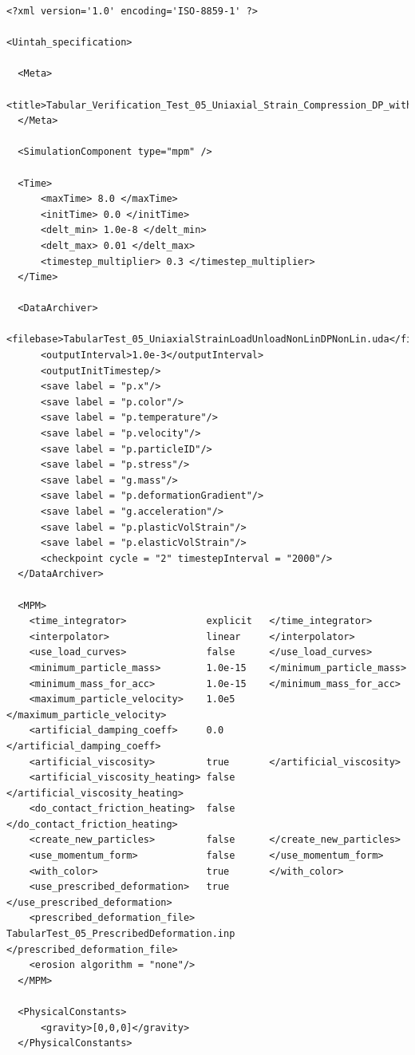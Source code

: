 \begin{lstlisting}
<?xml version='1.0' encoding='ISO-8859-1' ?>

<Uintah_specification>

  <Meta>
      <title>Tabular_Verification_Test_05_Uniaxial_Strain_Compression_DP_with_LoadUnload</title>
  </Meta>

  <SimulationComponent type="mpm" />

  <Time>
      <maxTime> 8.0 </maxTime>
      <initTime> 0.0 </initTime>
      <delt_min> 1.0e-8 </delt_min>
      <delt_max> 0.01 </delt_max>
      <timestep_multiplier> 0.3 </timestep_multiplier>
  </Time>

  <DataArchiver>
      <filebase>TabularTest_05_UniaxialStrainLoadUnloadNonLinDPNonLin.uda</filebase>
      <outputInterval>1.0e-3</outputInterval>
      <outputInitTimestep/>
      <save label = "p.x"/>
      <save label = "p.color"/>
      <save label = "p.temperature"/>
      <save label = "p.velocity"/>
      <save label = "p.particleID"/>
      <save label = "p.stress"/>
      <save label = "g.mass"/>
      <save label = "p.deformationGradient"/>
      <save label = "g.acceleration"/>
      <save label = "p.plasticVolStrain"/>
      <save label = "p.elasticVolStrain"/>
      <checkpoint cycle = "2" timestepInterval = "2000"/>
  </DataArchiver>

  <MPM>
    <time_integrator>              explicit   </time_integrator>
    <interpolator>                 linear     </interpolator>
    <use_load_curves>              false      </use_load_curves>
    <minimum_particle_mass>        1.0e-15    </minimum_particle_mass>
    <minimum_mass_for_acc>         1.0e-15    </minimum_mass_for_acc>
    <maximum_particle_velocity>    1.0e5      </maximum_particle_velocity>
    <artificial_damping_coeff>     0.0        </artificial_damping_coeff>
    <artificial_viscosity>         true       </artificial_viscosity>
    <artificial_viscosity_heating> false      </artificial_viscosity_heating>
    <do_contact_friction_heating>  false      </do_contact_friction_heating>
    <create_new_particles>         false      </create_new_particles>
    <use_momentum_form>            false      </use_momentum_form>
    <with_color>                   true       </with_color>
    <use_prescribed_deformation>   true       </use_prescribed_deformation>
    <prescribed_deformation_file>  TabularTest_05_PrescribedDeformation.inp   </prescribed_deformation_file>
    <erosion algorithm = "none"/>
  </MPM>

  <PhysicalConstants>
      <gravity>[0,0,0]</gravity>
  </PhysicalConstants>


\end{lstlisting}
